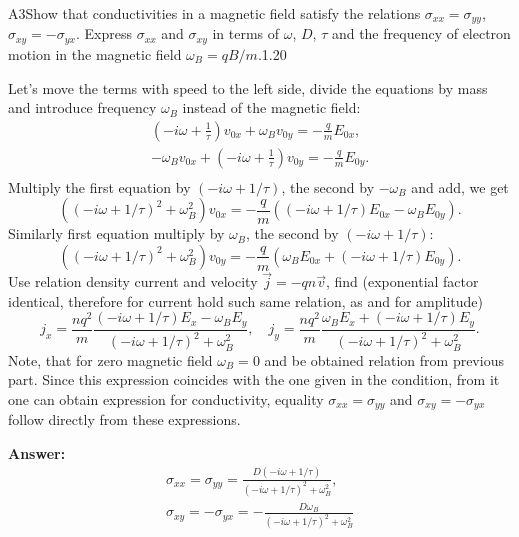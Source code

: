 \documentclass[11pt,a4paper]{article}
\begin{document}
\begin{solcard}{A3}{Show that conductivities in a magnetic field satisfy the relations $\sigma_{xx} = \sigma_{yy}$, $\sigma_{xy} = - \sigma_{yx}$. Express $\sigma_{xx}$ and $\sigma_{xy}$ in terms of $\omega$, $D$, $\tau$ and the frequency of electron motion in the magnetic field $\omega_B = qB/m$.}{1.20}

Let's move the terms with speed to the left side, divide the equations by mass and introduce frequency $\omega_B$ instead of the magnetic field: \begin{align*} \left( -i \omega + \frac{1}{\tau}\right) v_{0x} +\omega_B v_{0y} = - \frac{q}{m} E_{0x}, \\ - \omega_B v_{0x} +\left( -i \omega + \frac{1}{\tau}\right) v_{0y} = - \frac{q}{m} E_{0y} . \\ \end{align*} Multiply the first equation by $(-i\omega + 1/\tau)$, the second by $-\omega_B$ and add, we get $$ \left( (-i\omega + 1/\tau)^2 + \omega_B^2\right) v_{0x} = - \frac{q}{m}\left((-i\omega + 1/\tau) E_{0x} - \omega_B E_{0y} \right). $$Similarly first equation multiply by $\omega_B$, the second by $(-i\omega + 1/\tau)$: $$ \left( (-i\omega + 1/\tau)^2 + \omega_B^2\right) v_{0y} = - \frac{q}{m}\left(\omega_B E_{0x} + (-i\omega + 1/\tau) E_{0y}  \right). $$ Use relation density current and velocity $\vec{j} = -q n \vec{v}$, find (exponential factor identical, therefore for current hold such same relation, as and for amplitude) $$ j_x = \frac{nq^2}{m} \frac{(-i\omega + 1/\tau) E_{x} - \omega_B E_{y} }{ (-i\omega + 1/\tau)^2 + \omega_B^2}, \quad j_y = \frac{nq^2}{m} \frac{\omega_B E_{x} + (-i\omega + 1/\tau) E_{y}  }{ (-i\omega + 1/\tau)^2 + \omega_B^2}. $$Note, that for zero magnetic field $\omega_B = 0$ and be obtained relation from previous part. Since this expression coincides with the one given in the condition, from it one can obtain expression for conductivity, equality $\sigma_{xx} = \sigma_{yy}$ and $\sigma_{xy} = - \sigma_{yx}$ follow directly from these expressions.

\par\smallskip\noindent\textbf{Answer:} \begin{align*} \sigma_{xx} = \sigma_{yy} = \frac{D (-i \omega + 1/\tau)}{(-i\omega + 1/\tau)^2 + \omega_B^2},\\ \sigma_{xy} = - \sigma_{yx} = -\frac{D \omega_B}{(-i\omega + 1/\tau)^2 + \omega_B^2} \end{align*}
\end{solcard}
\end{document}
